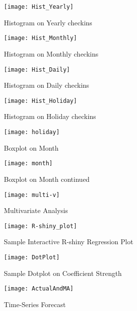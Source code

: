 \documentclass{article}
\begin{document}
\begin{figure}[!htbp]
  \centering
    \texttt{[image: Hist\_Yearly]}
  \caption{Histogram on Yearly checkins}

\end{figure}

\begin{figure}[!htbp]
  \centering
    \texttt{[image: Hist\_Monthly]}
  \caption{Histogram on Monthly checkins}

\end{figure}

\begin{figure}[!htbp]
  \centering
    \texttt{[image: Hist\_Daily]}
  \caption{Histogram on Daily checkins}

\end{figure}

\begin{figure}[!htbp]
  \centering
    \texttt{[image: Hist\_Holiday]}
  \caption{Histogram on Holiday checkins}

\end{figure}
 
\begin{figure}[!htbp]
  \centering
    \texttt{[image: holiday]}
  \caption{Boxplot on Month}

\end{figure}

\begin{figure}[!htbp]
  \centering
    \texttt{[image: month]}
  \caption{Boxplot on Month continued}

\end{figure}

\begin{figure}[!htbp]
  \centering
    \texttt{[image: multi-v]}
  \caption{Multivariate Analysis}

\end{figure}

\begin{figure}[!htbp]
  \centering
    \texttt{[image: R-shiny\_plot]}
  \caption{Sample Interactive R-shiny Regression Plot}
\end{figure}

\begin{figure}[!htbp]
  \centering
    \texttt{[image: DotPlot]}
  \caption{Sample Dotplot on Coefficient Strength}
\end{figure}

\begin{figure}[!htbp]
  \centering
    \texttt{[image: ActualAndMA]}
  \caption{Time-Series Forecast}
\end{figure}
\end{document}
